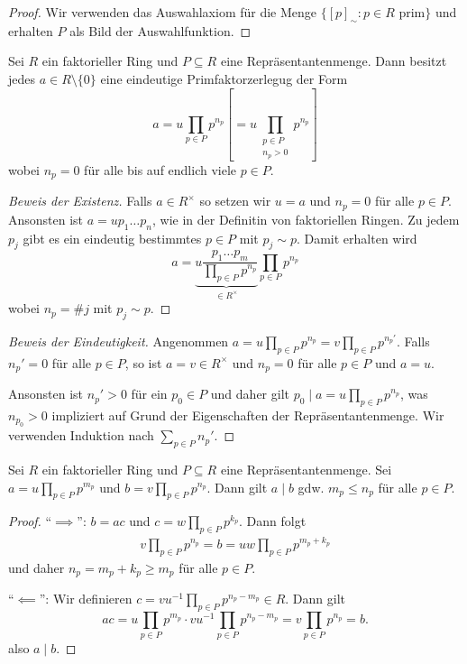 \begin{proof}
	Wir verwenden das Auswahlaxiom für die Menge $\{[p]_{\sim}: p \in R \text{ prim}\} $ und erhalten
	$P$ als Bild der Auswahlfunktion.
\end{proof}

\begin{theorem}
	Sei $R$ ein faktorieller Ring und $P \subseteq R$ eine Repräsentantenmenge.
	Dann besitzt jedes $a \in R \setminus \{0\}$ eine eindeutige Primfaktorzerlegug
	der Form 
	\[
		a = u \prod_{p \in P} p^{n_p} \left[ = u \prod_{\substack{p \in P\\ n_{p} > 0}} p^{n_{p}}  \right]
	\] 
	wobei $n_{p} = 0$ für alle bis auf endlich viele $p \in P$.
\end{theorem}

\begin{proof}[Beweis der Existenz]
	Falls $a \in R^{\times}$ so setzen wir $u = a$ und $n_{p} = 0$ für alle $p \in P$.
	Ansonsten ist $a = u p_1 \ldots p_{n}$, wie in der Definitin von faktoriellen Ringen.
	Zu jedem $p_{j}$ gibt es ein eindeutig bestimmtes $p \in P$ mit $p_{j} \sim p$.
	Damit erhalten wird
	\[
		a = \underbrace{u \frac{p_1 \ldots p_{m}}{\prod_{p \in P} p^{n_{p}} }}_{\in R^{\times}} \prod_{p \in P} p^{n_{p}}
	\] 
	wobei $n_{p} = \#j$ mit $p_{j} \sim p$.
\end{proof}

\begin{proof}[Beweis der Eindeutigkeit]
	Angenommen $a = u \prod_{p \in P} p^{n_{p}} = v \prod_{p \in P} p^{n_{p}'}$.
	Falls $n_{p}' = 0$ für alle $p \in  P$, so ist $a = v \in R^{\times}$ und $n_{p} = 0$ für alle $p \in P$ und $a = u$.

	Ansonsten ist $n_{p}' > 0$ für ein $p_0 \in P$ und daher gilt $p_0 \mid a = u \prod_{p \in P} p^{n_{p}}$,
	was $n_{p_0} > 0$ impliziert auf Grund der Eigenschaften der Repräsentantenmenge.
	Wir verwenden Induktion nach $\sum_{p \in P} n_{p}' $.
\end{proof}

\begin{lemma}
	Sei $R$ ein faktorieller Ring und $P \subseteq R$ eine Repräsentantenmenge.
	Sei $a = u \prod_{p \in P} p^{m_{p}}$ und $b = v \prod_{p \in P} p^{n_{p}}$.
	Dann gilt $a \mid b$ gdw. $m_{p} \leq n_{p}$ für alle $p \in P$.
\end{lemma}

\begin{proof}
	\enquote{$\implies$}: $b = ac$ und $c = w \prod_{p \in P} p^{k_{p}}$. Dann folgt
	\begin{align*}
		v  \prod_{p \in P} p^{n_{p}} = b = u w \prod_{p \in P} p^{m_{p} + k_{p}}
	\end{align*}
	und daher $n_{p} = m_{p} + k_{p} \geq m_{p}$ für alle $p \in P$.

	\enquote{$\impliedby$}: Wir definieren $c = v u^{-1} \prod_{p \in P} p^{n_{p} - m_{p}} \in R$.
	Dann gilt
	\[
	a c = u \prod_{p \in P} p^{m_{p}} \cdot v u^{-1} \prod_{p \in P} p^{n_{p} - m_{p}} = v \prod_{p \in P} p^{n_{p}} = b
	.\] 
	also $a \mid b$.
\end{proof}

